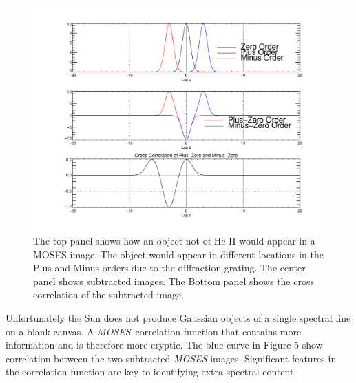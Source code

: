 \documentclass[]{aastex6}
\newcommand{\MOSES}{\textit{MOSES}}
\begin{document}
\begin{figure}[t]
\centering
\includegraphics[scale=.5]{images/test1.pdf}
\caption{The top panel shows how an object not of He II would appear in a MOSES image. The object would appear in different locations in the Plus and Minus orders due to the diffraction grating.  The center panel shows subtracted images.  The Bottom panel shows the cross correlation of the subtracted image.}
\end{figure}	

Unfortunately the Sun does not produce Gaussian objects of a single spectral line on a blank canvas. A \MOSES \ correlation function that contains more information and is therefore more cryptic. The blue curve in Figure 5 show correlation between the two subtracted \textit{MOSES} images. Significant features in the correlation function are key to identifying extra spectral content.
\end{document}

